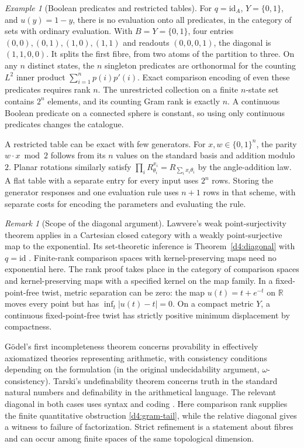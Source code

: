 \documentclass[11pt,reqno]{amsart}
\theoremstyle{definition}
\theoremstyle{remark}
\newtheorem{remark}[theorem]{Remark}
\newtheorem{example}[theorem]{Example}
\numberwithin{equation}{section}
\begin{document}
\begin{example}[Boolean predicates and restricted tables]\label{d4:tables}
For \(q=\mathrm{id}_A\), \(Y=\{0,1\}\), and \(u(y)=1-y\), there is no
evaluation onto all predicates, in the category of sets with ordinary
evaluation. With \(B=Y=\{0,1\}\), four entries \((0,0),(0,1),(1,0),(1,1)\)
and readouts \((0,0,0,1)\), the diagonal is \((1,1,0,0)\).
It splits the first fibre, from two atoms of the partition to three.
On any \(n\) distinct states, the \(n\) singleton predicates are
orthonormal for the counting \(L^2\) inner product
\(\sum_{i=1}^{n}p(i)p'(i)\). Exact comparison encoding of even these
predicates requires rank \(n\). The unrestricted collection on a finite
\(n\)-state set contains \(2^n\) elements, and its counting Gram rank is
exactly \(n\). A continuous Boolean predicate on a connected sphere is
constant, so using only continuous predicates changes the catalogue.

A restricted table can be exact with few generators. For
\(x,w\in\{0,1\}^n\), the parity \(w\cdot x\bmod 2\) follows from its \(n\)
values on the standard basis and addition modulo \(2\). Planar rotations
similarly satisfy \(\prod_i R_{\theta_i}^{x_i}=R_{\sum_i x_i\theta_i}\)
by the angle-addition law. A flat table with a separate entry for every
input uses \(2^n\) rows. Storing the generator responses and one evaluation
rule uses \(n+1\) rows in that scheme, with separate costs for encoding
the parameters and evaluating the rule.
\end{example}

\begin{remark}[Scope of the diagonal argument]\label{d4:logic}
Lawvere's weak point-surjectivity theorem applies in a Cartesian closed
category with a weakly point-surjective map to the exponential. Its
set-theoretic inference is Theorem~\ref{d4:diagonal} with \(q=\mathrm{id}\)
\cite{d4-lawvere,d4-yanofsky}. Finite-rank comparison spaces with
kernel-preserving maps need no exponential here. The rank proof takes
place in the category of comparison spaces and kernel-preserving maps
with a specified kernel on the map family. In a fixed-point-free twist,
metric separation can be zero: the map
\(u(t)=t+e^{-t}\) on \(\mathbb R\) moves every point but has
\(\inf_t|u(t)-t|=0\). On a compact metric \(Y\), a continuous fixed-point-free
twist has strictly positive minimum displacement by compactness.

G\"odel's first incompleteness theorem concerns provability in effectively
axiomatized theories representing arithmetic, with consistency conditions
depending on the formulation (in the original undecidability argument,
\(\omega\)-consistency). Tarski's undefinability theorem concerns truth
in the standard natural numbers and definability in the arithmetical
language. The relevant diagonal in both cases uses syntax and coding
\cite[Theorem~VI]{d4-godel}\cite{d4-tarski}.
Here comparison rank supplies the finite quantitative obstruction
\eqref{d4:gram-tail}, while the relative diagonal gives a witness to
failure of factorization. Strict refinement is a statement about fibres
and can occur among finite spaces of the same topological dimension.
\end{remark}
\end{document}
